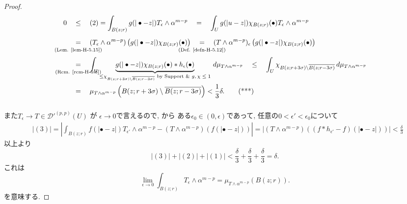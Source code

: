 \begin{proof}
\begin{align*}
0
&\underalign{}{\leq}
(2) = \int_{B(z;r)}
g(|\bullet-z|)T_\epsilon\wedge\alpha^{m-p}
\underalign{}{=}
\int_U
g(|u-z|)\chi_{B(z;r)}(\bullet)
T_\epsilon\wedge\alpha^{m-p}
\\ 
&\underalign{\text{(Lem. \ref{lem-H-5.15})}}{=}
(T_\epsilon\wedge\alpha^{m-p})
\left(
g(|\bullet-z|)\chi_{B(z;r)}(\bullet)
\right)
\underalign{\text{(Def. \ref{defn-H-5.12})}}{=}
(T\wedge\alpha^{m-p})_\epsilon
\left(
g(|\bullet-z|)\chi_{B(z;r)}(\bullet)
\right)
\\
&\underalign{\text{(Rem. \ref{rem-H-5.8})}}{=}
\int_U
\underbrace{
g(|\bullet-z|)\chi_{B(z;r)}(\bullet)*h_\epsilon(\bullet)}_{\le \chi_{B(z;r+3\sigma)\setminus\overline{B(z;r-3\sigma)}} \text{ by Support \& $g, \chi \le 1$}}
\,d\mu_{T\wedge\alpha^{m-p}}
\underalign{}{\leq}
\int_U
\chi_{B(z;r+3\sigma)\setminus\overline{B(z;r-3\sigma)}}
\,d\mu_{T\wedge\alpha^{m-p}}
\\
&\underalign{}{=}
\mu_{T\wedge\alpha^{m-p}}
\left(
B(z;r+3\sigma)\setminus\overline{B(z;r-3\sigma)}
\right)
<
\frac{1}{3}\delta.
\tag{***}
\end{align*}

また$T_\epsilon\longrightarrow T \in \mathcal{D}'^{(p,p)}(U)$
が
$\epsilon\longrightarrow0$で言えるので, 
\cite[Theorem 6.32(b)]{Rud}から
ある$\epsilon_0\in(0,\epsilon)$であって, 
任意の$0<\epsilon'<\epsilon_0$について
\begin{align*}
&
|(3)|=
\left|
\int_{B(z;r)}
f(|\bullet-z|)T_{\epsilon'}\wedge\alpha^{m-p}
-
(T\wedge\alpha^{m-p})(f(|\bullet-z|))
\right|
=
\left|
(T\wedge\alpha^{m-p})
\left(
(f*h_{\epsilon'}-f)(|\bullet-z|)
\right)
\right|
<
\frac{\delta}{3}
\end{align*}
以上より
\begin{equation*}
|(3)|
+
|(2)|
+
|(1)|
<
\frac{\delta}{3}
+
\frac{\delta}{3}
+
\frac{\delta}{3}
=
\delta.
\end{equation*}
これは
\begin{equation*}
\lim_{\epsilon\to0}
\int_{B(z;r)}
T_\epsilon\wedge\alpha^{m-p}
=
\mu_{T\wedge\alpha^{m-p}}(B(z;r)).
\end{equation*}
を意味する. 
\end{proof}


